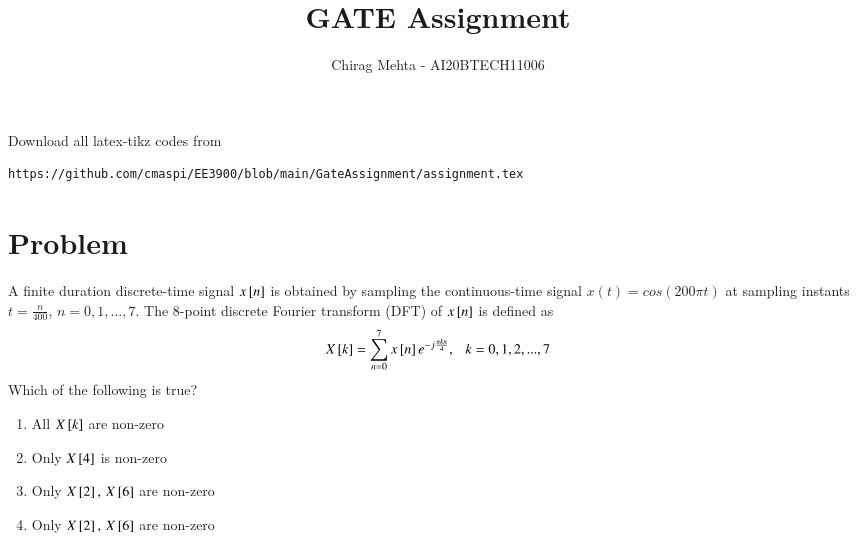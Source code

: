 \documentclass[journal,12pt,twocolumn]{IEEEtran}
\begin{document}
     \def\rightbox#1{\makebox[0in][r]{#1}}
     \def\centbox#1{\makebox[0in]{#1}}
     \def\topbox#1{\raisebox{-\baselineskip}[0in][0in]{#1}}
     \def\midbox#1{\raisebox{-0.5\baselineskip}[0in][0in]{#1}}
\vspace{3cm}
\title{GATE Assignment}
\author{Chirag Mehta - AI20BTECH11006}
\maketitle
\newpage
\bigskip
\renewcommand{\thefigure}{\theenumi}
\renewcommand{\thetable}{\theenumi}
Download all latex-tikz codes from 
\begin{lstlisting}
https://github.com/cmaspi/EE3900/blob/main/GateAssignment/assignment.tex
\end{lstlisting}
\section{Problem}
A finite duration discrete-time signal $x{}\left[n\right]$ is obtained by sampling the continuous-time signal $x(t)= cos(200\pi t)$ at sampling instants $t=\frac{n}{400}$, $n=0,1,...,7.$ The 8-point discrete Fourier transform (DFT) of $x{}\left[n\right]$ is defined as
\begin{align}
    X{}\left[k\right]=\displaystyle \sum_{n=0}^7 x{}\left[n\right]e^{-j\frac{\pi kn}{4}},\ \ \ k=0,1,2,...,7
\end{align}
Which of the following is true?
\begin{enumerate}
    \item All $X{}\left[k\right] $ are non-zero
    \item Only $X{}\left[4\right]$ is non-zero
    \item Only $X{}\left[2\right],\, X{}\left[6\right]$ are non-zero
    \item Only $X{}\left[2\right],\, X{}\left[6\right]$ are non-zero
\end{enumerate}
\end{document}
